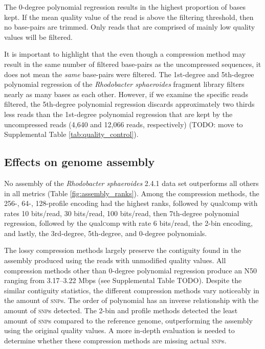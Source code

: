 \documentclass{bioinfo}
\begin{document}
The 0-degree polynomial regression results in the highest proportion
of bases kept. If the mean quality value of the read is above
the filtering threshold, then no base-pairs are trimmed. Only
reads that are comprised of mainly low quality values will be
filtered.

It is important to highlight that the even though a compression method
may result in the same number of filtered base-pairs as the
uncompressed sequences, it does not mean the \emph{same} base-pairs
were filtered. The 1st-degree and 5th-degree polynomial regression of
the \textit{Rhodobacter sphaeroides} fragment library filters nearly
as many bases as each other. However, if we examine the specific
reads filtered, the 5th-degree polynomial regression discards
approximately two thirds less reads than the 1st-degree polynomial
regression that are kept by the uncompressed reads (4,640 and
12,066 reads, respectively) (TODO: move to Supplemental Table
\ref{tab:quality_control}).

\subsection{Effects on genome assembly}

No assembly of the \textit{Rhodobacter sphaeroides} 2.4.1 data set
outperforms all others in all metrics (Table
\ref{fig:assembly_ranks}).
Among the compression methods, the 256-, 64-, 128-profile encoding had
the highest ranks, followed by \textsc{q}ual\textsc{c}omp with rates 10 bits/read, 30
bits/read, 100 bits/read, then 7th-degree polynomial regression,
followed by the \textsc{q}ual\textsc{c}omp with rate 6 bits/read, the 2-bin encoding,
and lastly, the 3rd-degree, 5th-degree, and 0-degree polynomials.

The lossy compression methods largely preserve the contiguity found in
the assembly produced using the reads with unmodified quality
values. All compression methods other than 0-degree polynomial
regression produce an N50 ranging from 3.17--3.22 Mbps (see
Supplemental Table TODO). Despite the similar contiguity statistics,
the different compression methods vary noticeably in the amount of
\textsc{snp}s. The order of polynomial has an inverse relationship
with the amount of \textsc{snp}s detected. The 2-bin and profile
methods detected the least amount of \textsc{snp}s compared to the
reference genome, outperforming the assembly using the original
quality values. A more in-depth evaluation is needed to determine
whether these compression methods are missing actual \textsc{snp}s.
\end{document}
